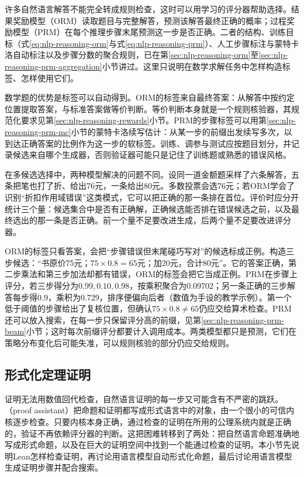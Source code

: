 许多自然语言解答不能完全转成规则检查，这时可以用学习的评分器帮助选择。结果奖励模型（ORM）读取题目与完整解答，预测该解答最终正确的概率；过程奖励模型（PRM）在每个推理步骤末尾预测这一步是否正确。二者的结构、训练目标（式\eqref{eq:nlp-reasoning-orm}与式\eqref{eq:nlp-reasoning-prm}）、人工步骤标注与蒙特卡洛自动标注以及步骤分数的聚合规则，已在第\ref{sec:nlp-reasoning-orm}至\ref{sec:nlp-reasoning-prm-aggregation}小节讲过。这里只说明在数学求解任务中怎样构造标签、怎样使用它们。

数学题的优势是标签可以自动得到。ORM的标签来自最终答案：从解答中按约定位置提取答案，与标准答案做等价判断。等价判断本身就是一个规则核验器，其规范化要求见第\ref{sec:nlp-reasoning-rewards}小节。PRM的步骤标签可以用第\ref{sec:nlp-reasoning-prm-mc}小节的蒙特卡洛续写估计：从某一步的前缀出发续写多次，以到达正确答案的比例作为这一步的软标签。训练、调参与测试应按题目划分，并记录候选来自哪个生成器，否则验证器可能只是记住了训练题或熟悉的错误风格。

在多候选选择中，两种模型解决的问题不同。设同一道金额题采样了六条解答，五条把笔也打了折、给出76元，一条给出80元。多数投票会选76元；若ORM学会了识别“折扣作用域错误”这类模式，它可以把正确的那一条排在首位。评价时应分开统计三个量：候选集合中是否有正确解，正确候选能否排在错误候选之前，以及最终选出的那一条是否正确。前一个量不足要改进生成，后两个量不足要改进评分器。

ORM的标签只看答案，会把“步骤错误但末尾碰巧写对”的候选标成正例。构造三步候选：“书原价75元；$75\times0.8=65$元；加20元，合计80元”。它的答案正确，第二步乘法和第三步加法却都有错误，ORM的标签会把它当成正例。PRM在步骤上评分，若三步得分为$0.99,0.10,0.98$，按乘积聚合为$0.09702$；另一条正确的三步解答每步得0.9，乘积为$0.729$，排序便偏向后者（数值为手设的教学示例）。第一个低于阈值的步骤给出了复核位置，但确认$75\times0.8\ne65$仍应交给算术检查。PRM还可以放入搜索，在每一步只保留评分高的前缀，见第\ref{sec:nlp-reasoning-prm-beam}小节；这时每次前缀评分都要计入调用成本。两类模型都只是预测，它们在策略分布变化后可能失准，可以规则核验的部分仍应交给规则。

\subsection{形式化定理证明}
\label{sec:nlp-execution-theorem-proving}

证明无法用数值回代检查，自然语言证明的每一步又可能含有不严密的跳跃。（proof assistant）把命题和证明都写成形式语言中的对象，由一个很小的可信内核逐步检查。只要内核本身正确，通过检查的证明在所用的公理系统内就是正确的，验证不再依赖评分器的判断。这把困难转移到了两处：把自然语言命题准确地写成形式命题，以及在巨大的证明空间中找到一个能通过检查的证明。本小节先说明Lean怎样检查证明，再讨论用语言模型自动形式化命题，最后讨论用语言模型生成证明步骤并配合搜索。

